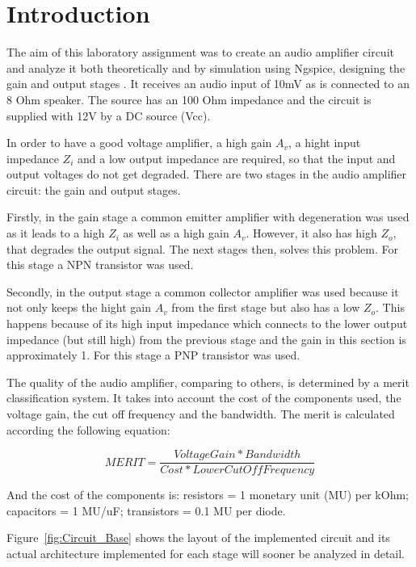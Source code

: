 \section{Introduction}
\label{sec:introduction}

The aim of this laboratory assignment was to create an audio amplifier circuit and analyze it both theoretically and by simulation using Ngspice, designing the gain and output stages . It receives an audio input of 10mV as is connected to an 8 Ohm speaker. The source has an 100 Ohm impedance and the circuit is supplied with 12V by a DC source (Vcc).

In order to have a good voltage amplifier, a high gain $A_v$, a hight input impedance $Z_i$ and a low output impedance are required, so that the input and output voltages do not get degraded. There are two stages in the audio amplifier circuit: the gain and output stages. 

Firstly, in the gain stage a common emitter amplifier with degeneration was used as it leads to a high $Z_i$ as well as a high gain $A_v$. However, it also has high $Z_o$, that degrades the output signal. The next stages then, solves this problem. For this stage a NPN transistor was used. 

Secondly, in the output stage a common collector amplifier was used because it not only keeps the hight gain $A_v$ from the first stage but also has a low $Z_o$. This happens because of its high input impedance which connects to the lower output impedance (but still high) from the previous stage and the gain in this section is approximately 1. For this stage a PNP transistor was used.

The quality of the audio amplifier, comparing to others, is determined by a merit classification system. It takes into account the cost of the components used, the voltage gain, the cut off frequency and the bandwidth. The merit is calculated according the following equation:

\begin{equation}
	MERIT = \frac {Voltage Gain * Bandwidth}{Cost * Lower Cut Off Frequency}
	\label{eq:i1}
\end{equation}

And the cost of the components is: resistors = 1 monetary unit (MU) per kOhm; capacitors = 1 MU/uF; transistors = 0.1 MU per diode.

Figure~\ref{fig:Circuit_Base} shows the layout of the implemented circuit and its actual architecture implemented for each stage will sooner be analyzed in detail.

